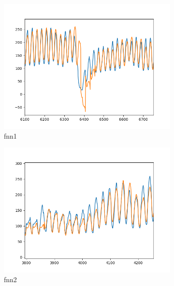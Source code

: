 \begin{figure}
    \centering
    \begin{subfigure}[b]{0.55\textwidth}
        \centering
        \includegraphics[width=\textwidth]{../Figures/fnn-1.png}
        \caption{fnn1}
        \label{fig:fnn1}
    \end{subfigure}
    \hfill
    \begin{subfigure}[b]{0.55\textwidth}
        \centering
        \includegraphics[width=\textwidth]{../Figures/fnn-2.png}
        \caption{fnn2}
        \label{fig:fnn2}
    \end{subfigure}
    \hfill
    \begin{subfigure}[b]{0.55\textwidth}
        \centering

\end{subfigure}
\end{figure}
